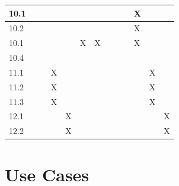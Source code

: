 \documentclass[11pt]{article}
\begin{document}
\begin{tabular}{ |p{0.2cm}|p{0.1cm}|p{0.5cm}|p{0.1cm}|p{0.1cm}|p{0.1cm}|p{0.1cm}|p{0.1cm}|p{0.1cm}|p{0.1cm}|p{0.1cm}|p{0.1cm}|p{0.1cm}|  }
 \hline

 10.1&  &   &   &   &   &   &   &   &   &  X &   &\\

 \hline

 10.2&  &   &   &   &   &   &   &   &   & X  &   &\\

 \hline

 10.1&  &   &   &   &  X & X  &   &   &   &  X &   &\\

 \hline

 10.4&  &   &   &   &   &   &   &   &   &   &   &\\

 \hline

 11.1&  &   &X   &   &   &   &   &   &   &   & X  &\\

 \hline

 11.2&  &   &X   &   &   &   &   &   &   &   & X  &\\

 \hline

 11.3&  &   &X   &   &   &   &   &   &   &   & X  &\\

 \hline

 12.1&  &   &   &X   &   &   &   &   &   &   &   &X\\

 \hline

 12.2&  &   &   & X  &   &   &   &   &   &   &   &X\\

 \hline

  \end{tabular}

\section{Use Cases}
\end{document}
